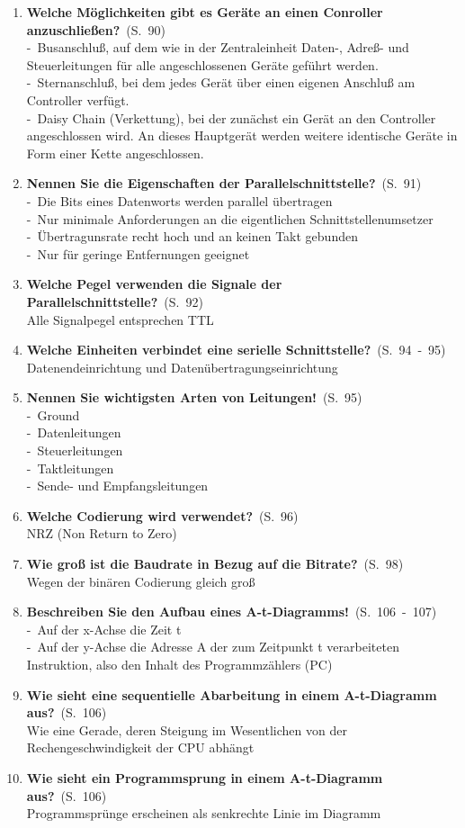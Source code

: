 \documentclass[a4paper,12pt]{article}
\newcommand{\question}[3]{\pagebreak[3]\item {\textbf{#1?}}\ (S.\ #2)#3}
\newcommand{\statement}[3]{\pagebreak[3]\item {\textbf{#1!}}\ (S.\ #2)#3}
\newcommand{\catchword}[1]{\\-\ #1}
\newcommand{\normaltext}[1]{\\#1}
\newcommand{\page}[1]{#1}
\newcommand{\pages}[2]{#1\ -\ #2}
\begin{document}
\begin{enumerate}
  \question{Welche Möglichkeiten gibt es Geräte an einen Conroller anzuschließen}{\page{90}}
  {
    \catchword{Busanschluß, auf dem wie in der Zentraleinheit Daten-, Adreß- und Steuerleitungen
    für alle angeschlossenen Geräte geführt werden.}
    \catchword{Sternanschluß, bei dem jedes Gerät über einen eigenen Anschluß am Controller verfügt.}
    \catchword{Daisy Chain (Verkettung), bei der zunächst ein Gerät an den Controller angeschlossen wird.
    An dieses Hauptgerät werden weitere identische Geräte in Form einer Kette angeschlossen.}
  }

  \question{Nennen Sie die Eigenschaften der Parallelschnittstelle}{\page{91}}
  {
    \catchword{Die Bits eines Datenworts werden parallel übertragen}
    \catchword{Nur minimale Anforderungen an die eigentlichen Schnittstellenumsetzer}
    \catchword{Übertragunsrate recht hoch und an keinen Takt gebunden}
    \catchword{Nur für geringe Entfernungen geeignet}
  }

  \question{Welche Pegel verwenden die Signale der Parallelschnittstelle}{\page{92}}
  {
    \normaltext{Alle Signalpegel entsprechen TTL}
  }

  \question{Welche Einheiten verbindet eine serielle Schnittstelle}{\pages{94}{95}}
  {
    \normaltext{Datenendeinrichtung und Datenübertragungseinrichtung}
  }

  \statement{Nennen Sie wichtigsten Arten von Leitungen}{\page{95}}
  {
    \catchword{Ground}
    \catchword{Datenleitungen}
    \catchword{Steuerleitungen}
    \catchword{Taktleitungen}
    \catchword{Sende- und Empfangsleitungen}
  }

  \question{Welche Codierung wird verwendet}{\page{96}}
  {
    \normaltext{NRZ (Non Return to Zero)}
  }

  \question{Wie groß ist die Baudrate in Bezug auf die Bitrate}{\page{98}}
  {
    \normaltext{Wegen der binären Codierung gleich groß}
  }

  \statement{Beschreiben Sie den Aufbau eines A-t-Diagramms}{\pages{106}{107}}
  {
    \catchword{Auf der x-Achse die Zeit t}
    \catchword{Auf der y-Achse die Adresse A der zum Zeitpunkt t verarbeiteten Instruktion,
               also den Inhalt des Programmzählers (PC)}
  }

  \question{Wie sieht eine sequentielle Abarbeitung in einem A-t-Diagramm aus}{\page{106}}
  {
    \normaltext{Wie eine Gerade, deren Steigung im Wesentlichen von der Rechengeschwindigkeit
                der CPU abhängt}
  }

  \question{Wie sieht ein Programmsprung in einem A-t-Diagramm aus}{\page{106}}
  {
    \normaltext{Programmsprünge erscheinen als senkrechte Linie im Diagramm}
  }


\end{enumerate}
\end{document}
